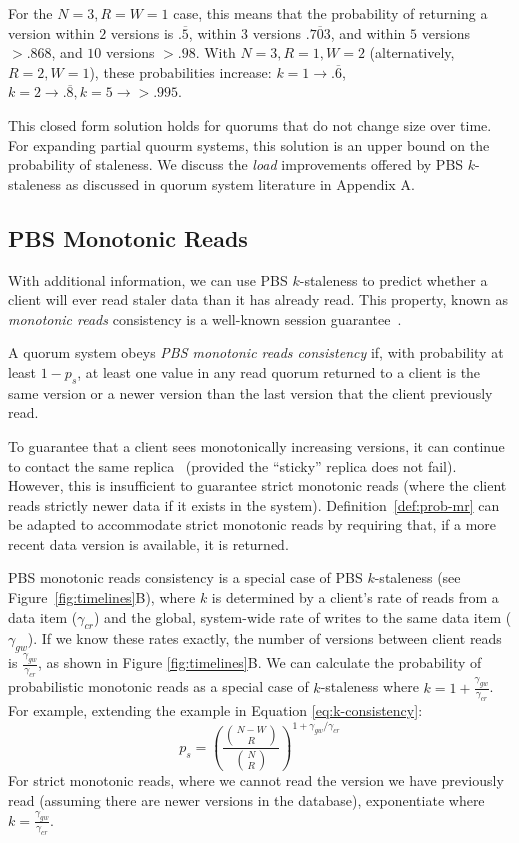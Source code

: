 \documentclass{vldb}
\begin{document}
For the $N=3, R=W=1$ case, this means that the probability of
returning a version within $2$ versions is $.\overline{5}$, within $3$
versions $.\overline{703}$, and within $5$ versions $> .868$, and $10$
versions $>.98$.  With $N=3, R=1, W=2$ (alternatively, $R=2, W=1$),
these probabilities increase: $k=1 \rightarrow
.\overline{6}$, $k=2 \rightarrow .\overline{8}, k=5 \rightarrow >
.995$.

This closed form solution holds for quorums that do not change size
over time.  For expanding partial quourm systems, this solution is an
upper bound on the probability of staleness.  We discuss the
\textit{load} improvements offered by PBS $k$-staleness as discussed
in quorum system literature in Appendix A.

\subsection{PBS Monotonic Reads}

With additional information, we can use PBS $k$-staleness to predict
whether a client will ever read staler data than it has already read.
This property, known as \textit{monotonic reads} consistency is a
well-known session guarantee~\cite{sessionguarantees}.

\begin{definition}
\label{def:prob-mr}
A quorum system obeys \textit{PBS monotonic reads consistency} if,
with probability at least $1-p_{s}$, at least one value in any
read quorum returned to a client is the same version or a newer
version than the last version that the client previously read.
\end{definition}

To guarantee that a client sees monotonically increasing versions, it
can continue to contact the same replica~\cite{vogels-defs} (provided
the ``sticky'' replica does not fail).  However, this is insufficient to
guarantee strict monotonic reads (where the client reads strictly
newer data if it exists in the system).  Definition~\ref{def:prob-mr}
can be adapted to accommodate strict monotonic reads by requiring
that, if a more recent data version is available, it is returned.

PBS monotonic reads consistency is a special case of PBS $k$-staleness (see
Figure~\ref{fig:timelines}B), where $k$ is determined by a client's
rate of reads from a data item ($\gamma_{cr}$) and the global,
system-wide rate of writes to the same data item ($\gamma_{gw}$).  If
we know these rates exactly, the number of versions between client
reads is $\frac{\gamma_{gw}}{\gamma_{cr}}$, as shown in Figure
\ref{fig:timelines}B.  We can calculate the probability of
probabilistic monotonic reads as a special case of $k$-staleness where
$k=1+\frac{\gamma_{gw}}{\gamma_{cr}}$.  For example, extending the
example in Equation \ref{eq:k-consistency}:
\begin{equation}
\label{eq:prob-mr}
p_{s} = \left(\frac{{N-W \choose R}}{{N \choose R}}\right)^{1+\gamma_{gw}/\gamma_{cr}}
\end{equation}
For strict monotonic reads, where we cannot read the version we have
previously read (assuming there are newer versions in the database),
exponentiate where $k=\frac{\gamma_{gw}}{\gamma_{cr}}$.
\end{document}
